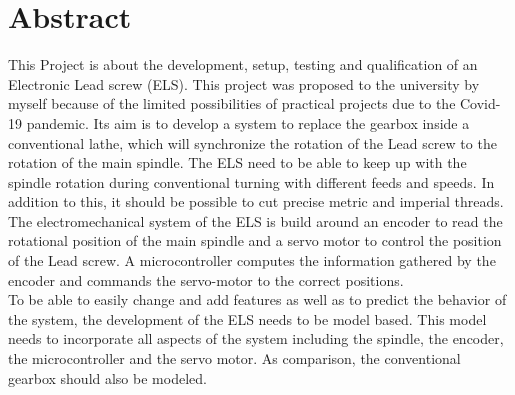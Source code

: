 \chapter*{Abstract}
\label{abstract}

This Project is about the development, setup, testing and qualification of an Electronic Lead screw (ELS). This project was proposed to the university by myself because of the limited possibilities of practical projects due to the Covid-19 pandemic.
Its aim is to develop a system to replace the gearbox inside a conventional lathe, which will synchronize the rotation of the Lead screw to the rotation of the main spindle.
The ELS need to be able to keep up with the spindle rotation during conventional turning with different feeds and speeds. In addition to this, it should be possible to cut
precise metric and imperial threads.\\
 
The electromechanical system of the ELS is build around an encoder to read the rotational position of the main spindle and a servo motor to control the position of the Lead screw.
A microcontroller computes the information gathered by the encoder and commands the servo-motor to the correct positions.\\
 
To be able to easily change and add features as well as to predict the behavior of the system, the development of the ELS needs to be model based. This model needs to incorporate all aspects of the system including the spindle, the encoder, the microcontroller and the servo motor. As comparison, the conventional gearbox should also be modeled.\\

